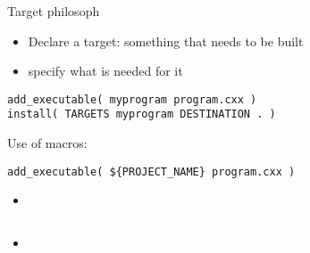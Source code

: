 \begin{numberedframe}{Target philosoph}
  \begin{itemize}
  \item Declare a target: something that needs to be built
  \item specify what is needed for it
  \end{itemize}
\begin{lstlisting}
add_executable( myprogram program.cxx )
install( TARGETS myprogram DESTINATION . )
\end{lstlisting}
Use of macros:
\begin{lstlisting}
add_executable( ${PROJECT_NAME} program.cxx )
\end{lstlisting}
\end{numberedframe}

\begin{numberedframe}{}
  \begin{itemize}
  \item 
  \end{itemize}
\begin{lstlisting}
\end{lstlisting}
\end{numberedframe}

\begin{numberedframe}{}
  \begin{itemize}
  \item 
  \end{itemize}
\begin{lstlisting}
\end{lstlisting}
\end{numberedframe}

